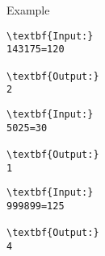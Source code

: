 Example
\begin{verbatim}
\textbf{Input:}
143175=120

\textbf{Output:}
2
\end{verbatim}
\begin{verbatim}
\textbf{Input:}
5025=30

\textbf{Output:}
1
\end{verbatim}
\begin{verbatim}
\textbf{Input:}
999899=125

\textbf{Output:}
4
\end{verbatim}